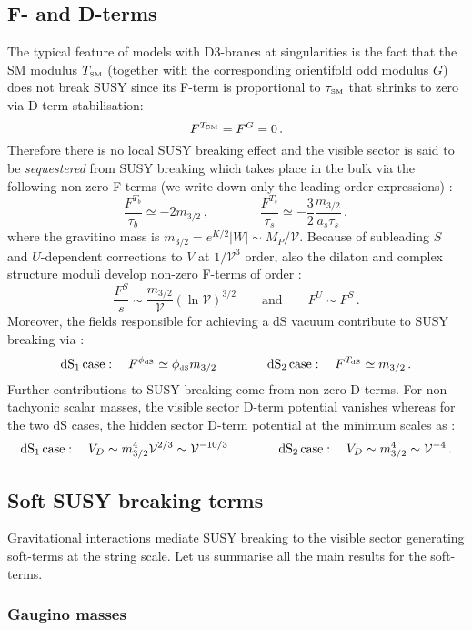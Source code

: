 \documentclass[11pt,a4paper]{article}
\newcommand{\be}{\begin{equation}}
\newcommand{\ee}{\end{equation}}
\def\SM{{\scriptscriptstyle \rm SM}}
\def\dS{{\scriptscriptstyle \rm dS}}
\newcommand\vo{{\mathcal{V}}}
\begin{document}
\subsection{F- and D-terms}
\label{sts}

The typical feature of models with D3-branes at singularities is the fact that the SM modulus $T_\SM$ (together with the corresponding orientifold odd modulus $G$) does not break SUSY since its F-term is proportional to $\tau_\SM$ that shrinks to zero via D-term stabilisation:
\be
F^{T_\SM} = F^G = 0\,.
\ee
Therefore there is no local SUSY breaking effect and the visible sector is said to be \textit{sequestered} from SUSY breaking which takes place in the bulk via the following non-zero F-terms (we write down only the leading order expressions) \cite{SoftTermsSeqLVS}:
\be
\frac{F^{T_b}}{\tau_b} \simeq -2 m_{3/2}\,, \qquad \qquad \frac{F^{T_s}}{\tau_s} \simeq -\frac 32 \frac{m_{3/2}}{a_s\tau_s}\,, 
\ee
where the gravitino mass is $m_{3/2} = e^{K/2} |W| \sim M_P/\vo$. Because of subleading $S$ and $U$-dependent corrections to $V$ at $1/\vo^3$ order, also the dilaton and complex structure moduli develop non-zero F-terms of order \cite{SoftTermsSeqLVS}:
\be
\frac{F^S}{s}\sim \frac{m_{3/2}}{\vo}\left(\ln\vo\right)^{3/2}\qquad\text{and}\qquad F^U\sim F^S\,.
\ee
Moreover, the fields responsible for achieving a dS vacuum contribute to SUSY breaking via \cite{SoftTermsSeqLVS}:
\be
{\rm dS}_1 \, {\rm case}: \quad F^{\phi_\dS} \simeq \phi_\dS m_{3/2}  \qquad\qquad {\rm dS}_2 \,{\rm case}: \quad F^{T_\dS} \simeq m_{3/2}\,.
\ee
Further contributions to SUSY breaking come from non-zero D-terms. For non-tachyonic scalar masses, the visible sector D-term potential vanishes whereas for the two dS cases, the hidden sector D-term potential at the minimum scales as \cite{SoftTermsSeqLVS}:
\be
{\rm dS}_1 \, {\rm case}: \quad V_D \sim m_{3/2}^4 \vo^{2/3} \sim \vo^{-10/3}  \qquad\qquad {\rm dS}_2 \,{\rm case}: \quad V_D\sim m_{3/2}^4 \sim \vo^{-4}\,.
\ee


\subsection{Soft SUSY breaking terms}

Gravitational interactions mediate SUSY breaking to the visible sector generating soft-terms at the string scale. Let us summarise all the main results for the soft-terms.

\subsubsection{Gaugino masses}
\end{document}
